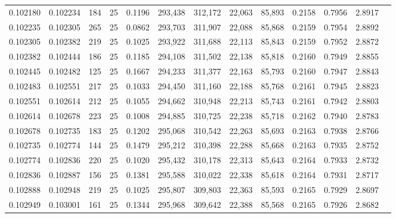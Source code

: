 \begin{tabular}{rrrrrrrrrrrrr}
0.102180 & 0.102234 &   184 &  25 &                                     0.1196 & 293,438 & 312,172 &  22,063 &  85,893 & 0.2158 & 0.7956 & 2.8917 \\
0.102235 & 0.102305 &   265 &  25 &                                     0.0862 & 293,703 & 311,907 &  22,088 &  85,868 & 0.2159 & 0.7954 & 2.8892 \\
0.102305 & 0.102382 &   219 &  25 &                                     0.1025 & 293,922 & 311,688 &  22,113 &  85,843 & 0.2159 & 0.7952 & 2.8872 \\
0.102382 & 0.102444 &   186 &  25 &                                     0.1185 & 294,108 & 311,502 &  22,138 &  85,818 & 0.2160 & 0.7949 & 2.8855 \\
0.102445 & 0.102482 &   125 &  25 &                                     0.1667 & 294,233 & 311,377 &  22,163 &  85,793 & 0.2160 & 0.7947 & 2.8843 \\
0.102483 & 0.102551 &   217 &  25 &                                     0.1033 & 294,450 & 311,160 &  22,188 &  85,768 & 0.2161 & 0.7945 & 2.8823 \\
0.102551 & 0.102614 &   212 &  25 &                                     0.1055 & 294,662 & 310,948 &  22,213 &  85,743 & 0.2161 & 0.7942 & 2.8803 \\
0.102614 & 0.102678 &   223 &  25 &                                     0.1008 & 294,885 & 310,725 &  22,238 &  85,718 & 0.2162 & 0.7940 & 2.8783 \\
0.102678 & 0.102735 &   183 &  25 &                                     0.1202 & 295,068 & 310,542 &  22,263 &  85,693 & 0.2163 & 0.7938 & 2.8766 \\
0.102735 & 0.102774 &   144 &  25 &                                     0.1479 & 295,212 & 310,398 &  22,288 &  85,668 & 0.2163 & 0.7935 & 2.8752 \\
0.102774 & 0.102836 &   220 &  25 &                                     0.1020 & 295,432 & 310,178 &  22,313 &  85,643 & 0.2164 & 0.7933 & 2.8732 \\
0.102836 & 0.102887 &   156 &  25 &                                     0.1381 & 295,588 & 310,022 &  22,338 &  85,618 & 0.2164 & 0.7931 & 2.8717 \\
0.102888 & 0.102948 &   219 &  25 &                                     0.1025 & 295,807 & 309,803 &  22,363 &  85,593 & 0.2165 & 0.7929 & 2.8697 \\
0.102949 & 0.103001 &   161 &  25 &                                     0.1344 & 295,968 & 309,642 &  22,388 &  85,568 & 0.2165 & 0.7926 & 2.8682 \\

\end{tabular}
